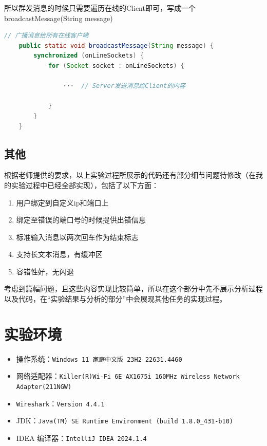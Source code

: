 \documentclass{article}
\begin{document}
	所以群发消息的时候只需要遍历在线的Client即可，写成一个broadcastMessage(String message)
	
	\begin{lstlisting}[language=Java, title=广播群发给所有的Client, tabsize=4]
	// 广播消息给所有在线客户端
	public static void broadcastMessage(String message) {
		synchronized (onLineSockets) {
			for (Socket socket : onLineSockets) {
				
				···  // Server发送消息给Client的内容
				
			}
		}
	}
	\end{lstlisting}
	
	\subsection{其他}
	
	根据老师提供的要求，以上实验过程所展示的代码还有部分细节问题待修改（在我的实验过程中已经全部实现），包括了以下方面：
	
	\begin{enumerate}[noitemsep, label={{\arabic*})}]
		\item 用户绑定到自定义ip和端口上
		\item 绑定至错误的端口号的时候提供出错信息
		\item 标准输入消息以两次回车作为结束标志
		\item 支持长文本消息，有缓冲区
		\item 容错性好，无闪退
	\end{enumerate}\textbf{}
	
	考虑到篇幅问题，且这些内容实现比较简单，所以在这个部分中先不展示分析过程以及代码，在“实验结果与分析的部分”中会展现其他任务的实现过程。
	
	\section{实验环境}
	
	\begin{itemize}[noitemsep]
		\item 操作系统：\texttt{Windows 11 家庭中文版 23H2 22631.4460}
		\item 网络适配器：\texttt{Killer(R)Wi-Fi 6E AX1675i 160MHz Wireless Network Adapter(211NGW)}
		\item \texttt{Wireshark}：\texttt{Version 4.4.1}
		\item JDK：\texttt{Java(TM) SE Runtime Environment (build 1.8.0\_431-b10)}
		\item IDEA 编译器：\texttt{IntelliJ IDEA 2024.1.4}
	\end{itemize}
	
\end{document}
